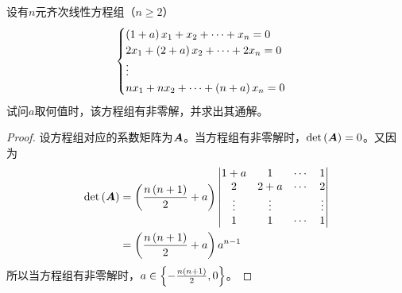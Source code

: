 \begin{problem}\label{problem-2.8}
设有\(n\)元齐次线性方程组（\(n\ge2\)）
\begin{equation*}
    \begin{cases}
        \left( 1+a \right)x_1+x_2+\cdots+x_n=0   \\
        2x_1+\left( 2+a \right)x_2+\cdots+2x_n=0 \\
        \vdots                           \\
        nx_1+nx_2+\cdots+\left( n+a \right)x_n=0
    \end{cases}
\end{equation*}
试问\(a\)取何值时，该方程组有非零解，并求出其通解。
\end{problem}
\begin{proof}
    设方程组对应的系数矩阵为\(\boldsymbol{A}\)。当方程组有非零解时，\(\mathrm{det}\left( \boldsymbol{A} \right)=0\)。又因为
    \begin{align*}
        \mathrm{det}\left( \boldsymbol{A} \right) & =\left( \frac{n\left( n+1 \right)}{2}+a \right)
        \begin{vmatrix}
            1+a    & 1      & \cdots & 1      \\
            2      & 2+a    & \cdots & 2      \\
            \vdots & \vdots &        & \vdots \\
            1      & 1      & \cdots & 1
        \end{vmatrix}                    \\
                    & =\left( \frac{n\left( n+1 \right)}{2}+a \right)a^{n-1}
    \end{align*}
    所以当方程组有非零解时，\(a\in\left\{-\frac{n\left( n+1 \right)}{2},0 \right\}\)。


\end{proof}
